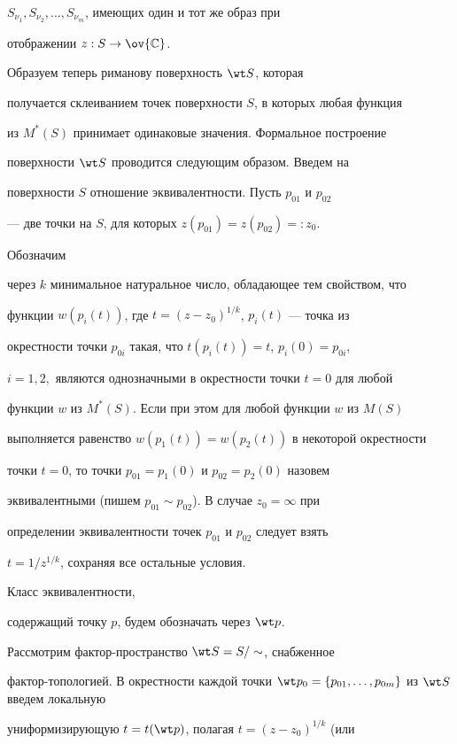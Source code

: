 \begin{pf}
$S_{\nu_1}, S_{\nu_2},\dotsc,S_{\nu_m}$, имеющих один и тот же образ при


отображении $z: S\to \ov{\Bbb C}$.





Образуем теперь риманову поверхность $\wt S$, которая


получается склеиванием точек поверхности $S$, в которых любая функция


из $M^*(S)$ принимает одинаковые значения. Формальное построение


поверхности $\wt S$ проводится следующим образом. Введем на


поверхности $S$ отношение эквивалентности. Пусть $p_{01}$ и $p_{02}$


--- две точки на $S$, для которых $z(p_{01})=z(p_{02})=:z_0$.


Обозначим


через $k$ минимальное натуральное число, обладающее тем свойством, что


функции $w(p_i(t))$, где $t=(z-z_0)^{1/k}$, $p_i(t)$ --- точка из


окрестности точки $p_{0i}$ такая, что $t(p_i(t))=t$, $p_i(0)=p_{0i}$,


$i=1,2,$ являются однозначными в окрестности точки $t=0$ для любой


функции $w$ из $M^*(S)$. Если при этом для любой функции $w$ из $M(S)$


выполняется равенство $w(p_1(t))=w(p_2(t))$ в некоторой окрестности


точки $t=0$, то точки $p_{01}=p_1(0)$ и $p_{02}=p_2(0)$ назовем


эквивалентными (пишем $p_{01}\sim p_{02}$). В случае $z_0=\infty$ при


определении эквивалентности точек $p_{01}$ и $p_{02}$ следует взять


$t=1/z^{1/k}$, сохраняя все остальные условия.


Класс эквивалентности,


содержащий точку $p$, будем обозначать через $\wt p$.





Рассмотрим фактор-пространство $\wt S=S/\sim$, снабженное


фактор-топологией. В окрестности каждой точки $\wt


p_0=\{p_{01},\dotsc,p_{0m}\}$ из $\wt S$ введем локальную


униформизирующую $t=t(\wt p)$, полагая $t=(z-z_0)^{1/k}$ (или



\end{pf}
